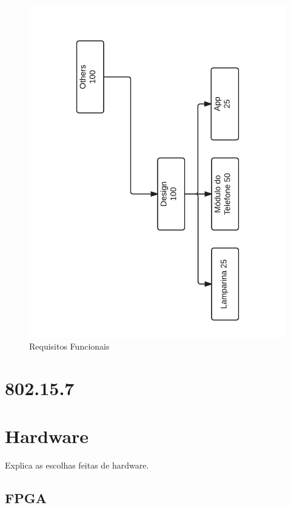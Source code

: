 	\begin{figure}[h!]
		\caption{\label{fig_req3} Requisitos Funcionais }
		\centering
		\includegraphics[width=1.0\textwidth, trim={1cm 1cm 1cm 1cm}, clip]{ReqTree3.pdf}
	\end{figure}
	
	
	\section{802.15.7}\label{sec-norma}
	
	
	
	\section{Hardware}\label{sec-hardware}
	
	Explica as escolhas feitas de hardware.
	
	\subsection{FPGA}\label{hard-fpga}
	
